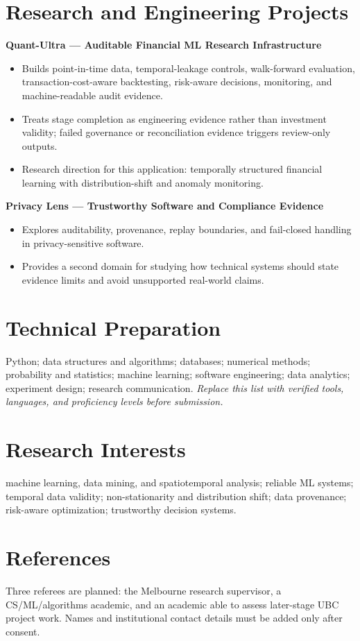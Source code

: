 \documentclass[11pt]{article}
\begin{document}
\section*{Research and Engineering Projects}
\textbf{Quant-Ultra --- Auditable Financial ML Research Infrastructure}
\begin{itemize}
\item Builds point-in-time data, temporal-leakage controls, walk-forward evaluation, transaction-cost-aware backtesting, risk-aware decisions, monitoring, and machine-readable audit evidence.
\item Treats stage completion as engineering evidence rather than investment validity; failed governance or reconciliation evidence triggers review-only outputs.
\item Research direction for this application: temporally structured financial learning with distribution-shift and anomaly monitoring.
\end{itemize}

\begin{samepage}
\textbf{Privacy Lens --- Trustworthy Software and Compliance Evidence}
\begin{itemize}
\item Explores auditability, provenance, replay boundaries, and fail-closed handling in privacy-sensitive software.
\item Provides a second domain for studying how technical systems should state evidence limits and avoid unsupported real-world claims.
\end{itemize}
\end{samepage}

\section*{Technical Preparation}
Python; data structures and algorithms; databases; numerical methods; probability and statistics; machine learning; software engineering; data analytics; experiment design; research communication. \textit{Replace this list with verified tools, languages, and proficiency levels before submission.}

\section*{Research Interests}
machine learning, data mining, and spatiotemporal analysis; reliable ML systems; temporal data validity; non-stationarity and distribution shift; data provenance; risk-aware optimization; trustworthy decision systems.

\section*{References}
Three referees are planned: the Melbourne research supervisor, a CS/ML/algorithms academic, and an academic able to assess later-stage UBC project work. Names and institutional contact details must be added only after consent.
\end{document}
